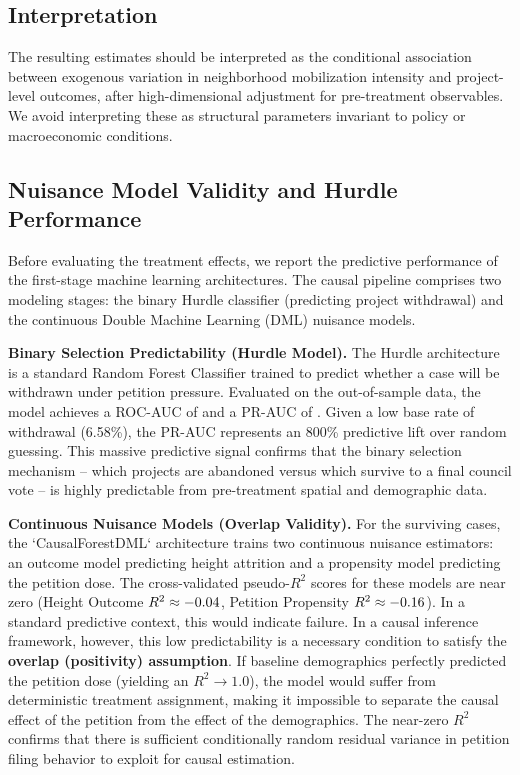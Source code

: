 \documentclass[11pt, letterpaper, oneside]{article}
\begin{document}
\subsection{Interpretation}

The resulting estimates should be interpreted as the conditional association between exogenous variation in neighborhood mobilization intensity and project-level outcomes, after high-dimensional adjustment for pre-treatment observables. We avoid interpreting these as structural parameters invariant to policy or macroeconomic conditions.


\subsection{Nuisance Model Validity and Hurdle Performance}
\label{sec:nuisance_validity}

Before evaluating the treatment effects, we report the predictive performance of the first-stage machine learning architectures. The causal pipeline comprises two modeling stages: the binary Hurdle classifier (predicting project withdrawal) and the continuous Double Machine Learning (DML) nuisance models.

\textbf{Binary Selection Predictability (Hurdle Model).} The Hurdle architecture is a standard Random Forest Classifier trained to predict whether a case will be withdrawn under petition pressure. Evaluated on the out-of-sample data, the model achieves a ROC-AUC of \metricHurdleROCAUC{} and a PR-AUC of \metricHurdlePRAUC{}. Given a low base rate of withdrawal (6.58\%), the PR-AUC represents an 800\% predictive lift over random guessing. This massive predictive signal confirms that the binary selection mechanism -- which projects are abandoned versus which survive to a final council vote -- is highly predictable from pre-treatment spatial and demographic data.

\textbf{Continuous Nuisance Models (Overlap Validity).} For the surviving cases, the `CausalForestDML` architecture trains two continuous nuisance estimators: an outcome model predicting height attrition and a propensity model predicting the petition dose. The cross-validated pseudo-$R^2$ scores for these models are near zero (Height Outcome $R^2 \approx -0.04{}$, Petition Propensity $R^2 \approx -0.16{}$). In a standard predictive context, this would indicate failure. In a causal inference framework, however, this low predictability is a necessary condition to satisfy the \textbf{overlap (positivity) assumption}. If baseline demographics perfectly predicted the petition dose (yielding an $R^2 \rightarrow 1.0$), the model would suffer from deterministic treatment assignment, making it impossible to separate the causal effect of the petition from the effect of the demographics. The near-zero $R^2$ confirms that there is sufficient conditionally random residual variance in petition filing behavior to exploit for causal estimation.
\end{document}
